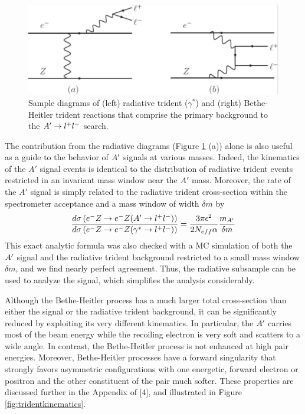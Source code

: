 \begin{figure}
\includegraphics[scale=1]{measurements/rad-bh-diagrams.pdf}
\caption{Sample diagrams of (left) radiative trident ($\gamma^*$) and (right) Bethe-Heitler trident reactions that comprise the primary background to the $A^\prime\rightarrow l^+l^-$  search.}
\label{fig:radbhdiagram}
\end{figure}

The contribution from the radiative diagrams (Figure \ref{fig:radbhdiagram} (a)) alone is also useful as a guide to the behavior of $A^\prime$ signals at various masses. Indeed, the kinematics of the $A'$ signal events is identical to the distribution of radiative trident events restricted in an invariant mass window near the $A'$ mass. Moreover, the rate of the $A'$ signal is simply related to the radiative trident cross-section within the spectrometer acceptance and a mass window of width $\delta m$ by 
\begin{equation}
\frac{d\sigma\left(e^- Z \rightarrow e^- Z(A^\prime\rightarrow l^+l^-)\right)}{d\sigma\left(e^- Z \rightarrow e^- Z(\gamma^*\rightarrow l^+l^-)\right)}=\frac{3\pi\epsilon^2}{2 N_{eff}\alpha}\frac{m_{A^\prime}}{\delta m}
\end{equation}
This exact analytic formula was also checked with a MC simulation of both the $A^\prime$ signal and the radiative trident background restricted to a small mass window $\delta m$, and we find nearly perfect agreement. Thus, the radiative subsample can be used to analyze the signal, which simplifies the analysis considerably.

 Although the Bethe-Heitler process has a much larger total cross-section than either the signal or the radiative trident background, it can be significantly reduced by exploiting its very different kinematics. In particular, the $A^\prime$ carries most of the beam energy while the recoiling electron is very soft and scatters to a wide angle. In contrast, the Bethe-Heitler process is not enhanced at high pair energies. Moreover, Bethe-Heitler processes have a forward singularity that strongly favors asymmetric configurations with one energetic, forward electron or positron and the other constituent of the pair much softer.
These properties are discussed further in the Appendix of [4], and illustrated in Figure \ref{fig:tridentkinematics}.

